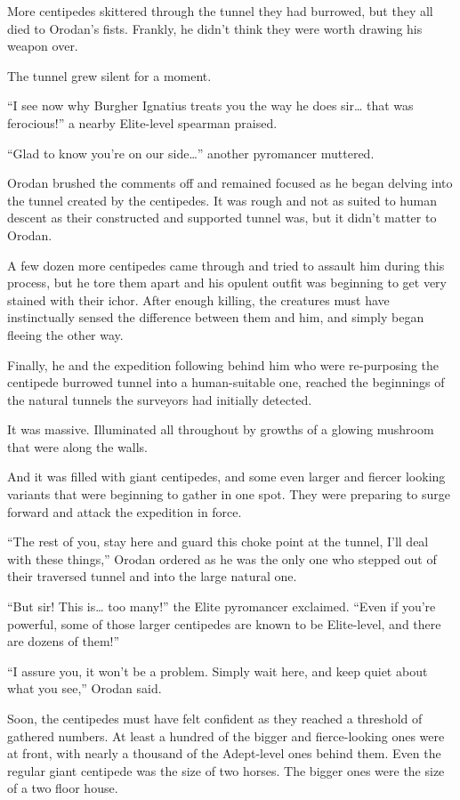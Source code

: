 \documentclass[a4paper,10pt]{book}
\begin{document}
More centipedes skittered through the tunnel they had burrowed, but they all died to Orodan’s fists. Frankly, he didn’t think they were worth drawing his weapon over.\par
The tunnel grew silent for a moment.\par
“I see now why Burgher Ignatius treats you the way he does sir… that was ferocious!” a nearby Elite-level spearman praised.\par
“Glad to know you’re on our side…” another pyromancer muttered.\par
Orodan brushed the comments off and remained focused as he began delving into the tunnel created by the centipedes. It was rough and not as suited to human descent as their constructed and supported tunnel was, but it didn’t matter to Orodan.\par
A few dozen more centipedes came through and tried to assault him during this process, but he tore them apart and his opulent outfit was beginning to get very stained with their ichor. After enough killing, the creatures must have instinctually sensed the difference between them and him, and simply began fleeing the other way.\par
Finally, he and the expedition following behind him who were re-purposing the centipede burrowed tunnel into a human-suitable one, reached the beginnings of the natural tunnels the surveyors had initially detected.\par
It was massive. Illuminated all throughout by growths of a glowing mushroom that were along the walls.\par
And it was filled with giant centipedes, and some even larger and fiercer looking variants that were beginning to gather in one spot. They were preparing to surge forward and attack the expedition in force.\par
“The rest of you, stay here and guard this choke point at the tunnel, I’ll deal with these things,” Orodan ordered as he was the only one who stepped out of their traversed tunnel and into the large natural one.\par
“But sir! This is… too many!” the Elite pyromancer exclaimed. “Even if you’re powerful, some of those larger centipedes are known to be Elite-level, and there are dozens of them!”\par
“I assure you, it won’t be a problem. Simply wait here, and keep quiet about what you see,” Orodan said.\par
Soon, the centipedes must have felt confident as they reached a threshold of gathered numbers. At least a hundred of the bigger and fierce-looking ones were at front, with nearly a thousand of the Adept-level ones behind them. Even the regular giant centipede was the size of two horses. The bigger ones were the size of a two floor house.\par
\end{document}
